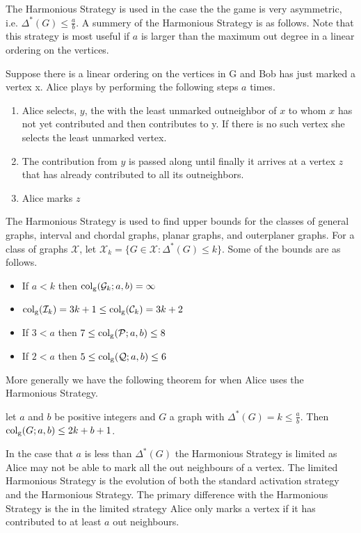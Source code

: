 The Harmonious Strategy is used in the case the the game is very asymmetric, i.e. $\Delta^*(G)\leq \frac{a}{b}$. A summery of the Harmonious Strategy is as follows. Note that this strategy is most useful if $a$ is larger than the maximum out degree in a linear ordering on the vertices.

Suppose there is a linear ordering on the vertices in G and Bob has just marked a vertex x. Alice plays by performing the following steps $a$ times.    
\begin{enumerate}
    \item  Alice selects, $y$, the with the least unmarked outneighbor of $x$ to whom $x$ has not yet contributed and then contributes to y. If there is no such vertex she selects the least unmarked vertex.
    \item  The contribution from $y$
    is passed along until finally it arrives at a vertex $z$ that has already
    contributed to all its outneighbors.
    \item  Alice marks $z$
\end{enumerate}

The Harmonious Strategy is used to find upper bounds for the classes of general graphs, interval and chordal graphs, planar graphs, and outerplaner graphs. For a class of graphs $\mathcal{X}$, let $\mathcal{X}_k= \{G\in\mathcal{X}: \Delta^*(G)\leq k\}$. Some of the bounds are as follows.    
\begin{itemize}
    \item If $a < k$ then $\operatorname{col_g}(\mathcal{G}_k;a,b)=\infty$
    \item $\operatorname{col_g}(\mathcal{I}_k)=3k+1\leq\operatorname{col_g}(\mathcal{C}_k)=3k+2$
    \item If $3<a $ then $7\leq \operatorname{col_g}(\mathcal{P};a,b)\leq 8$
    \item If $2< a$ then $5\leq \operatorname{col_g}(\mathcal{Q};a,b)\leq 6$
\end{itemize}
More generally we have the following theorem for when Alice uses the Harmonious Strategy.
\begin{theorem}
    let $a$ and $b$ be positive integers and $G$ a graph with $\Delta^*(G)=k\leq\frac{a}{b}$. Then $\operatorname{col_g}(G;a,b)\leq 2k+b+1$.
\end{theorem}

In the case that $a$ is less than $\Delta^*(G)$ the Harmonious Strategy is limited as Alice may not be able to mark all the out neighbours of a vertex. The limited Harmonious Strategy is the evolution of both the standard activation strategy and the Harmonious Strategy. The primary difference with the Harmonious Strategy is the in the limited strategy Alice only marks a vertex if it has contributed to at least $a$ out neighbours.    

